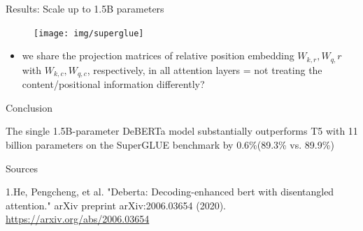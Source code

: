 \documentclass{beamer}
\begin{document}
\begin{frame}{Results: Scale up to 1.5B parameters}

\begin{figure}[h]
\texttt{[image: img/superglue]}
\end{figure}

\begin{itemize}
\item we share the projection matrices of relative position embedding $W_{k,r},W_{q,}r$ with $W_{k,c},W_{q,c}$, respectively, in all attention layers = not treating the content/positional information differently?
\end{itemize}

\end{frame}
\begin{frame}{Conclusion}

The single 1.5B-parameter DeBERTa model substantially outperforms T5 with 11 billion parameters on the SuperGLUE benchmark by 0.6\%(89.3\% vs. 89.9\%)

\end{frame}


\begin{frame}{Sources}
\begin{thebibliography}{0}

   1.He, Pengcheng, et al. "Deberta: Decoding-enhanced bert with disentangled attention." arXiv preprint arXiv:2006.03654 (2020). \url{https://arxiv.org/abs/2006.03654} 
  
  
\end{thebibliography}

\end{frame}

 
\end{document}

